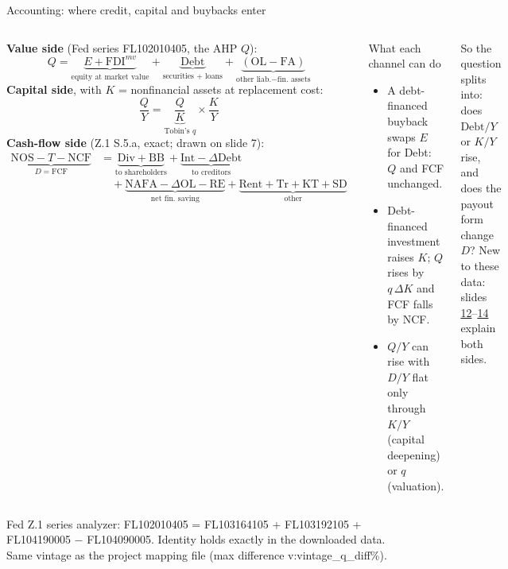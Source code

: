 \documentclass[aspectratio=169,10pt,t]{beamer}
\newcommand{\val}[1]{\csname v:#1\endcsname}
\newcommand{\src}[1]{\vfill{\tiny\textcolor{muted}{#1}\par}\vspace{0.1cm}}
\begin{document}
\begin{frame}{Accounting: where credit, capital and buybacks enter}
\vspace{0.1cm}
\begin{columns}[T]
{\small\textbf{Value side} (Fed series FL102010405, the AHP $Q$):}
{\footnotesize\[
Q=\underbrace{E+\mathrm{FDI}^{mv}}_{\text{equity at market value}}+\underbrace{\mathrm{Debt}}_{\text{securities + loans}}+\underbrace{(\mathrm{OL}-\mathrm{FA})}_{\text{other liab.} - \text{fin. assets}}
\]}
{\small\textbf{Capital side}, with $K$ = nonfinancial assets at replacement cost:}
{\footnotesize\[
\frac{Q}{Y}=\underbrace{\frac{Q}{K}}_{\text{Tobin's }q}\times\frac{K}{Y}
\]}
{\small\textbf{Cash-flow side} (Z.1 S.5.a, exact; drawn on slide 7):}
{\scriptsize\begin{align*}
\underbrace{\mathrm{NOS}-T-\mathrm{NCF}}_{D=\mathrm{FCF}}&=\underbrace{\mathrm{Div}+\mathrm{BB}}_{\text{to shareholders}}+\underbrace{\mathrm{Int}-\Delta\mathrm{Debt}}_{\text{to creditors}}\\[-0.1cm]
&\quad+\underbrace{\mathrm{NAFA}-\Delta\mathrm{OL}-\mathrm{RE}}_{\text{net fin.\ saving}}+\underbrace{\mathrm{Rent}+\mathrm{Tr}+\mathrm{KT}+\mathrm{SD}}_{\text{other}}
\end{align*}}
\begin{block}{What each channel can do}
\small
\begin{itemize}\setlength{\itemsep}{0.08cm}
\item A debt-financed buyback swaps $E$ for Debt: $Q$ and FCF unchanged.
\item Debt-financed investment raises $K$; $Q$ rises by $q\,\Delta K$ and FCF falls by NCF.
\item $Q/Y$ can rise with $D/Y$ flat only through $K/Y$ (capital deepening) or $q$ (valuation).
\end{itemize}
\end{block}
\vspace{0.12cm}
{\scriptsize So the question splits into: does $\mathrm{Debt}/Y$ or $K/Y$ rise, and does the payout form change $D$? \textcolor{inksec}{New to these data: slides \hyperlink{xvalue}{12}--\hyperlink{xlink}{14} explain both sides.}\par}
\end{columns}
\src{Fed Z.1 series analyzer: FL102010405 = FL103164105 + FL103192105 + FL104190005 $-$ FL104090005. Identity holds exactly in the downloaded data. Same vintage as the project mapping file (max difference \val{vintage_q_diff}\%).}
\end{frame}
\end{document}
